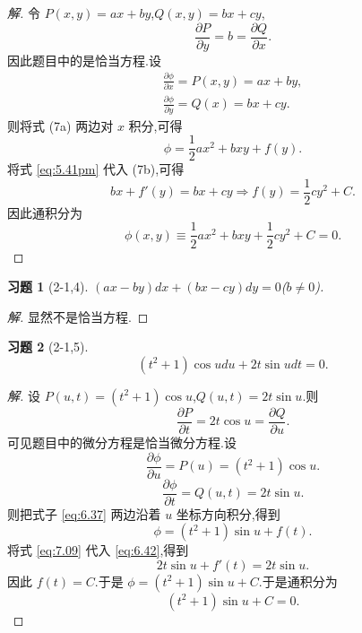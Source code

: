 \documentclass[twoside,11pt]{article}
\newtheorem*{cdtheorem}{习题}
\newenvironment{exercise}
{\begin{mdframed}[backgroundcolor=gray!40,rightline=false,leftline=false,topline=false,bottomline=false]\begin{cdtheorem}}
    {\end{cdtheorem}\end{mdframed}}
\newcommand{\pa}{\partial} \newcommand{\Om}{\Omega}
\begin{document}
\begin{proof}[解]
  令 $P(x,y)=ax+by$,$Q(x,y)=bx+cy$,
  \begin{equation}
    \label{eq:5.38pm}
    \frac{\pa P}{\pa y}=b=\frac{\pa Q}{\pa x}.
  \end{equation}
因此题目中的是恰当方程.设
\begin{subequations}
  \begin{align}
    \label{eq:5.39}
    \frac{\pa\phi}{\pa x}=P(x,y)=ax+by,\\
\frac{\pa \phi}{\pa y}=Q(x)=bx+cy.
  \end{align}
\end{subequations}
则将式 (7a) 两边对 $x$ 积分,可得
\begin{equation}
  \label{eq:5.41pm}
  \phi=\frac{1}{2}ax^2+bxy+f(y).
\end{equation}
将式 \eqref{eq:5.41pm} 代入 (7b),可得
\begin{equation}
  \label{eq:5.47pm}
bx+f'(y)=bx+cy\Rightarrow f(y)=\frac{1}{2}cy^2+C.
\end{equation}
因此通积分为
\begin{equation}
  \label{eq:5.51pm}
  \phi(x,y)\equiv\frac{1}{2}ax^2+bxy+\frac{1}{2}cy^2+C=0.
\end{equation}
\end{proof}
\begin{exercise}[2-1,4]
$(ax-by)dx+(bx-cy)dy=0$($b\neq 0$).  
\end{exercise}
\begin{proof}[解]
  显然不是恰当方程.
\end{proof}
\begin{exercise}[2-1,5]
$$
(t^2+1)\cos udu+2t\sin udt=0.
$$
\end{exercise}
\begin{proof}[解]
  设 $P(u,t)=(t^2+1)\cos u$,$Q(u,t)=2t\sin u$.则
$$
\frac{\pa P}{\pa t}=2t\cos u=\frac{\pa Q}{\pa u}.
$$
可见题目中的微分方程是恰当微分方程.设
\begin{equation}
  \label{eq:6.37}
  \frac{\pa \phi}{\pa u}=P(u)=(t^2+1)\cos u.
\end{equation}
\begin{equation}
  \label{eq:6.42}
  \frac{\pa \phi}{\pa t}=Q(u,t)=2t\sin u.
\end{equation}
则把式子 \eqref{eq:6.37} 两边沿着 $u$ 坐标方向积分,得到
\begin{equation}
  \label{eq:7.09}
 \phi=(t^2+1)\sin u+f(t).
\end{equation}
将式 \eqref{eq:7.09} 代入 \eqref{eq:6.42},得到
\begin{equation}
  \label{eq:714}
  2t\sin u+f'(t)=2t\sin u.
\end{equation}
因此 $f(t)=C$.于是 $\phi=(t^2+1)\sin u+C$.于是通积分为
$$
(t^2+1)\sin u+C=0.
$$
\end{proof}
\end{document}
